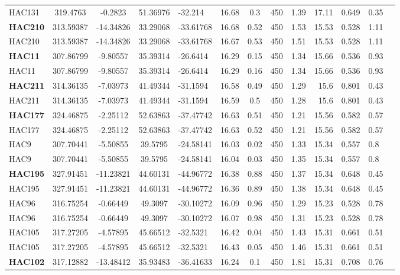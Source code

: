 \documentclass[a4paper,12pt]{article}
\begin{document}
\begin{longtable}{@{\extracolsep{\fill}}lccclccccrlll@{}}
HAC131 & 319.4763 & -0.2823 & 51.36976 & -32.214 & 16.68 & 0.3 & 450 & 1.39 & 17.11 & 0.649 & 0.35 \\
\textbf{HAC210} & 313.59387 & -14.34826 & 33.29068 & -33.61768 & 16.68 & 0.52 & 450 & 1.53 & 15.53 & 0.528 & 1.11 \\
HAC210 & 313.59387 & -14.34826 & 33.29068 & -33.61768 & 16.67 & 0.53 & 450 & 1.51 & 15.53 & 0.528 & 1.11 \\
\textbf{HAC11} & 307.86799 & -9.80557 & 35.39314 & -26.6414 & 16.29 & 0.15 & 450 & 1.34 & 15.66 & 0.536 & 0.93 \\
HAC11 & 307.86799 & -9.80557 & 35.39314 & -26.6414 & 16.29 & 0.16 & 450 & 1.34 & 15.66 & 0.536 & 0.93 \\
\textbf{HAC211} & 314.36135 & -7.03973 & 41.49344 & -31.1594 & 16.58 & 0.49 & 450 & 1.29 & 15.6 & 0.801 & 0.43 \\
HAC211 & 314.36135 & -7.03973 & 41.49344 & -31.1594 & 16.59 & 0.5 & 450 & 1.28 & 15.6 & 0.801 & 0.43 \\
\textbf{HAC177} & 324.46875 & -2.25112 & 52.63863 & -37.47742 & 16.63 & 0.51 & 450 & 1.21 & 15.56 & 0.582 & 0.57 \\
HAC177 & 324.46875 & -2.25112 & 52.63863 & -37.47742 & 16.63 & 0.52 & 450 & 1.21 & 15.56 & 0.582 & 0.57 \\
HAC9 & 307.70441 & -5.50855 & 39.5795 & -24.58141 & 16.03 & 0.02 & 450 & 1.33 & 15.34 & 0.557 & 0.8 \\
HAC9 & 307.70441 & -5.50855 & 39.5795 & -24.58141 & 16.04 & 0.03 & 450 & 1.35 & 15.34 & 0.557 & 0.8 \\
\textbf{HAC195} & 327.91451 & -11.23821 & 44.60131 & -44.96772 & 16.38 & 0.88 & 450 & 1.37 & 15.34 & 0.648 & 0.45 \\
HAC195 & 327.91451 & -11.23821 & 44.60131 & -44.96772 & 16.36 & 0.89 & 450 & 1.38 & 15.34 & 0.648 & 0.45 \\
HAC96 & 316.75254 & -0.66449 & 49.3097 & -30.10272 & 16.09 & 0.96 & 450 & 1.29 & 15.23 & 0.528 & 0.78 \\
HAC96 & 316.75254 & -0.66449 & 49.3097 & -30.10272 & 16.07 & 0.98 & 450 & 1.31 & 15.23 & 0.528 & 0.78 \\
HAC105 & 317.27205 & -4.57895 & 45.66512 & -32.5321 & 16.42 & 0.04 & 450 & 1.43 & 15.31 & 0.661 & 0.51 \\
HAC105 & 317.27205 & -4.57895 & 45.66512 & -32.5321 & 16.43 & 0.05 & 450 & 1.46 & 15.31 & 0.661 & 0.51 \\
\textbf{HAC102} & 317.12882 & -13.48412 & 35.93483 & -36.41633 & 16.24 & 0.1 & 450 & 1.81 & 15.31 & 0.708 & 0.76 \\

\end{longtable}
\end{document}
